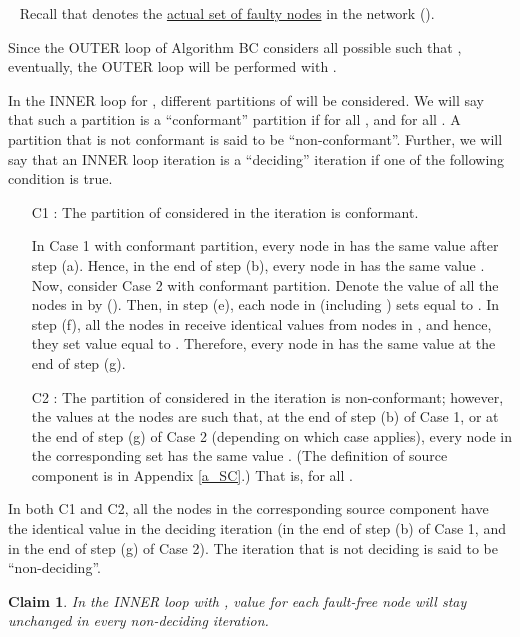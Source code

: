 \documentclass[letterpaper, 11pt]{article}
\newenvironment{proof}{\noindent {\bf Proof:}~}{\hspace*{\fill}}
\newtheorem{claim}{Claim}
\begin{document}
\begin{proof}
Recall that  denotes the \underline{actual set of faulty nodes} in
the network ().

Since the OUTER loop of Algorithm BC considers all possible 
such that , eventually, the OUTER loop will be
performed with .

In the INNER loop for , different partitions 
of  will be considered.
We will say that such a partition  is a ``conformant'' partition
if  for all , 
and  for all .
A partition  that is not conformant is said to be ``non-conformant''. Further, we will say that an INNER loop iteration is a ``deciding'' iteration if one of the following condition is true. 

\begin{itemize}
\item[C1]: The  partition of  considered in the iteration is conformant.

In Case 1 with conformant partition, every node in  has the same value   after step (a). Hence, in the end of step (b), every node in  has the same value . Now, consider Case 2 with conformant partition. Denote the value of all the nodes in  by  (). Then, in step (e), each node
  in  (including ) sets  equal to . In step (f), all the nodes in  receive identical values  from nodes in , and hence, they set value   equal to . Therefore, every node in  has the same value  at the end of step (g).

\item[C2]: The  partition of  considered in the iteration is non-conformant; however,
the values at the nodes are such that, at the end of step (b) of Case 1, or at the end of step (g) of Case 2 (depending on which case applies), every node in the corresponding set  has the same value . (The definition of source component is in Appendix \ref{a_SC}.) That is, for all .
\end{itemize}
In both C1 and C2, all the nodes in the corresponding source component  have the identical value  in the deciding iteration (in the end of step (b) of Case 1, and in the end of step (g) of Case 2). The iteration that is not deciding is said to be ``non-deciding''. 

\begin{claim}
\label{claim:deciding}
In the INNER loop with , value  for each fault-free node  will stay unchanged in every non-deciding iteration.
\end{claim}


\end{proof}
\end{document}
